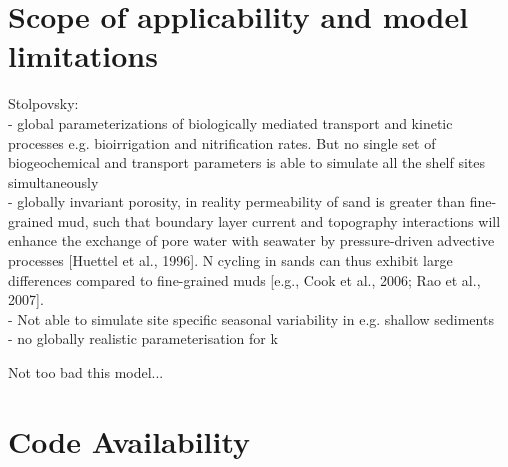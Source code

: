 \documentclass[gmd, manuscript]{copernicus}
\begin{document}
\section{Scope of applicability and model limitations}
Stolpovsky:\\
- global parameterizations of biologically mediated transport and kinetic processes e.g. bioirrigation and nitrification rates. 
But no single set of biogeochemical and transport parameters is able to simulate all the shelf sites simultaneously\\
- globally invariant porosity, in reality permeability of sand is greater than fine-grained mud, such that boundary layer current and
topography interactions will enhance the exchange of pore water with seawater by pressure-driven
advective processes [Huettel et al., 1996]. N cycling in sands can thus exhibit large differences
compared to fine-grained muds [e.g., Cook et al., 2006; Rao et al., 2007].\\ 
- Not able to simulate site specific seasonal variability in e.g. shallow sediments \\
- no globally realistic parameterisation for k 



\conclusions  %
Not too bad this model...

\section {Code Availability}


\appendix
\end{document}
